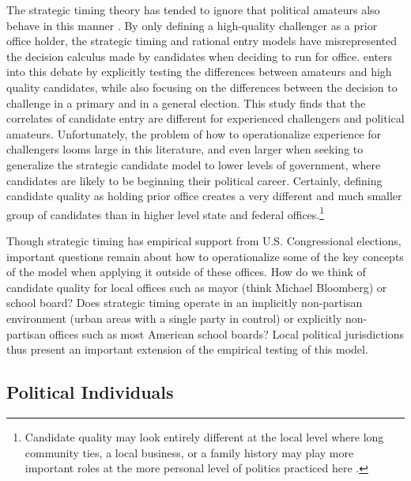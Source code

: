 The strategic timing theory has tended to ignore that political 
amateurs also behave in this manner \citep{CanonArt, CanonBook}. 
By only defining a high-quality challenger as a prior office holder, the strategic 
timing and rational entry models have misrepresented the decision calculus made 
by candidates when deciding to run for office. \citet{Lazarus2008} 
enters into this debate by explicitly testing the differences between amateurs 
and high quality candidates, while also focusing on the differences between the 
decision to challenge in a primary and in a general election. This study finds 
that the correlates of candidate entry are different for experienced challengers 
and political amateurs. Unfortunately, the problem of how to operationalize 
experience for challengers looms large in this literature, and even larger when 
seeking to generalize the strategic candidate model to lower levels of 
government, where candidates are likely to be beginning their political career. 
Certainly, defining candidate quality as holding prior office creates a very 
different and much smaller group of candidates than in higher level state and 
federal offices.\footnote{Candidate quality may look entirely different at the 
local level where long community ties, a local business, or a family history 
may play more important roles at the more personal level of politics practiced 
here \citep{oliver12}.}

Though strategic timing has empirical support from U.S. Congressional elections, 
important questions remain about how to operationalize some of the key concepts of 
the model when applying it outside of these offices. How do we think of candidate 
quality for local offices such as mayor (think Michael Bloomberg) or school board? 
Does strategic timing operate in an implicitly non-partisan environment (urban 
areas with a single party in control) or explicitly non-partisan offices such as 
most American school boards? Local political jurisdictions thus present an 
important extension of the empirical testing of this model. 

\subsection{Political Individuals}

